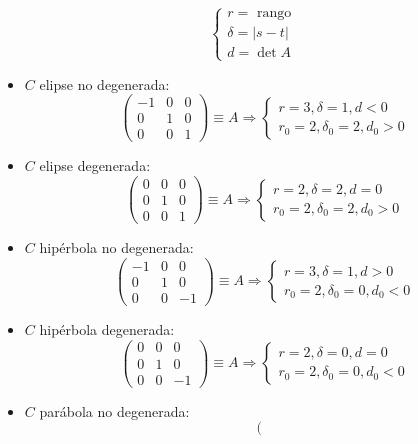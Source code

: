 \documentclass[10pt,a4paper,openright]{book}
\begin{document}
$$\begin{cases} r = \mbox{ rango} \\ \delta = |s-t| \\ d = \det A
\end{cases}$$
\begin{itemize}
\item $C$ elipse no degenerada:
$$\left(\begin{array}{c|cc}
-1 & 0 & 0 \\
\hline
0 & 1  & 0  \\
0 &  0 &1
\end{array}
\right) \equiv A \Rightarrow \begin{cases} r= 3 , \delta = 1, d < 0 \\ r_0 = 2, \delta_0 = 2, d_0 >0 \end{cases}$$
\item $C$ elipse degenerada:
$$\left(\begin{array}{c|cc}
0 & 0 & 0 \\
\hline
0 & 1  & 0  \\
0 &  0 &1
\end{array}
\right) \equiv A \Rightarrow \begin{cases} r= 2 , \delta = 2, d = 0 \\ r_0 = 2, \delta_0 = 2, d_0 >0 \end{cases}$$
\item $C$ hipérbola no degenerada:
$$\left(\begin{array}{c|cc}
-1 & 0 & 0 \\
\hline
0 & 1  & 0  \\
0 &  0 & -1
\end{array}
\right) \equiv A \Rightarrow \begin{cases} r= 3 , \delta = 1, d > 0 \\ r_0 = 2, \delta_0 = 0, d_0 < 0 \end{cases}$$
\item $C$ hipérbola degenerada:
$$\left(\begin{array}{c|cc}
0 & 0 & 0 \\
\hline
0 & 1  & 0  \\
0 &  0 & -1
\end{array}
\right) \equiv A \Rightarrow \begin{cases} r= 2 , \delta = 0, d = 0 \\ r_0 = 2, \delta_0 = 0, d_0 < 0 \end{cases}$$
\item $C$ parábola no degenerada:
$$\left(\begin{array}{c|cc}

\end{array}$$
\end{itemize}
\end{document}
